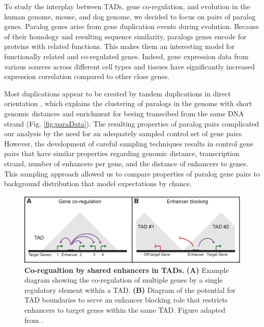\documentclass[a4paper,twoside=true,openright,parskip=full,chapterprefix=true,11pt,headings=normal,bibliography=totoc,listof=totoc,titlepage=on,captions=tableabove,draft=false]{scrreprt}
\theoremstyle{definition}
\theoremstyle{definition}
\theoremstyle{definition}
\theoremstyle{remark}
\begin{document}
To study the interplay between TADs, gene co-regulation, and evolution
in the human genome, mouse, and dog genome, we decided to focus on pairs
of paralog genes. Paralog genes arise from gene duplication events
during evolution. Because of their homology and resulting sequence
similarity, paralogs genes encode for proteins with related functions.
This makes them an interesting model for functionally related and
co-regulated genes. Indeed, gene expression data from various sources
across different cell types and tissues have significantly increased
expression correlation compared to other close genes.

Most duplications appear to be created by tandem duplications in direct
orientation \citep{Newman2015}, which explains the clustering of
paralogs in the genome with short genomic distances and enrichment for
beeing transcibed from the same DNA strand (Fig. \ref{fig:paraData}).
The resulting properties of paralog pairs complicated our analysis by
the need for an adequately sampled control set of gene pairs. However,
the development of careful sampling techniques results in control gene
pairs that have similar properties regarding genomic distance,
transcription strand, number of enhancers per gene, and the distance of
enhancers to genes. This sampling approach allowed us to compare
properties of paralog gene pairs to background distribution that model
expectations by chance.

\begin{figure}

{\centering \includegraphics[width=0.8\linewidth]{figures/Dixon2016_Fig3ab} 

}

\caption{\textbf{Co-regualtion by shared enhancers in TADs.}
\textbf{(A)} Example diagram showing the co-regulation of multiple genes
by a single regulatory element within a TAD. \textbf{(B)} Diagram of the
potential for TAD boundaries to serve an enhancer blocking role that
restricts enhancers to target genes within the same TAD. Figure adapted
from \citep{Dixon2016}.}\label{fig:CoRegTAD}
\end{figure}
\end{document}

